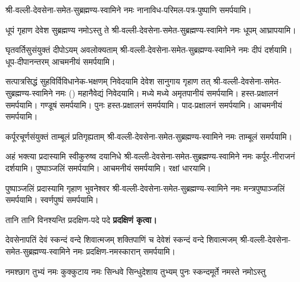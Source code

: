 \begin{center}
\begingroup
\setlength{\columnseprule}{1pt}
\let\chapt\sect



\endgroup

श्री-वल्ली-देवसेना-समेत-सुब्रह्मण्य-स्वामिने नमः नानाविध-परिमल-पत्र-पुष्पाणि समर्पयामि।


{धूपं गृहाण देवेश सुब्रह्मण्य नमोऽस्तु ते}
श्री-वल्ली-देवसेना-समेत-सुब्रह्मण्य-स्वामिने नमः धूपम् आघ्रापयामि।

{घृतवर्तिसुसंयुक्तं दीपोऽयम् अवलोक्यताम्}
श्री-वल्ली-देवसेना-समेत-सुब्रह्मण्य-स्वामिने नमः दीपं दर्शयामि। धूप-दीपानन्तरम् आचमनीयं समर्पयामि।

\twolineshloka
{सत्पात्रसिद्धं सुहविर्विविधानेक-भक्षणम्}
{निवेदयामि देवेश सानुगाय गृहाण तत्}
श्री-वल्ली-देवसेना-समेत-सुब्रह्मण्य-स्वामिने नमः () महानैवेद्यं निवेदयामि। 
मध्ये मध्ये अमृतपानीयं समर्पयामि। हस्त-प्रक्षालनं समर्पयामि। गण्डूषं समर्पयामि। पुनः हस्त-प्रक्षालनं समर्पयामि।
 पाद-प्रक्षालनं समर्पयामि। आचमनीयं समर्पयामि।

{कर्पूरचूर्णसंयुक्तं ताम्बूलं प्रतिगृह्यताम्}
श्री-वल्ली-देवसेना-समेत-सुब्रह्मण्य-स्वामिने नमः ताम्बूलं समर्पयामि।

{अहं भक्त्या प्रदास्यामि स्वीकुरुष्व दयानिधे}
श्री-वल्ली-देवसेना-समेत-सुब्रह्मण्य-स्वामिने नमः कर्पूर-नीराजनं दर्शयामि। 
पुष्पाञ्जलिं समर्पयामि। आचमनीयं समर्पयामि। रक्षां धारयामि।

{पुष्पाञ्जलिं प्रदास्यामि गृहाण भुवनेश्वर}
श्री-वल्ली-देवसेना-समेत-सुब्रह्मण्य-स्वामिने नमः मन्त्रपुष्पाञ्जलिं समर्पयामि। स्वर्णपुष्पं समर्पयामि।

{तानि तानि विनश्यन्ति प्रदक्षिण-पदे पदे}
\textbf{प्रदक्षिणं कृत्वा।}
\medskip

{देवसेनापतिं देवं स्कन्दं वन्दे शिवात्मजम्}
{शक्तिपाणिं च देवेशं स्कन्दं वन्दे शिवात्मजम्}
श्री-वल्ली-देवसेना-समेत-सुब्रह्मण्य-स्वामिने नमः प्रदक्षिण-नमस्कारान् समर्पयामि।

{नमश्छाग तुभ्यं नमः कुक्कुटाय}
{नमः सिन्धवे सिन्धुदेशाय तुभ्यम्}
{पुनः स्कन्दमूर्ते नमस्ते नमोऽस्तु}


\end{center}
